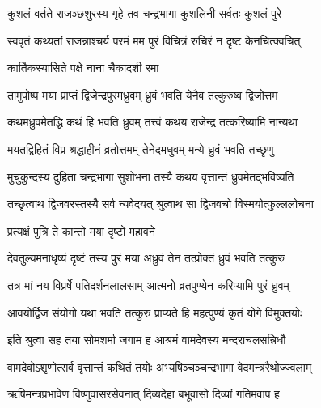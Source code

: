 
\twolineshloka
{कुशलं वर्तते राजञ्छशुरस्य गृहे तव}
{चन्द्रभागा कुशलिनी सर्वतः कुशलं पुरे} %

\twolineshloka
{स्ववृतं कथ्यतां राजन्नाश्चर्य परमं मम}
{पुरं विचित्रं रुचिरं न दृष्ट केनचित्क्वचित्} %



\onelineshloka
{कार्तिकस्यासिते पक्षे नाना चैकादशी रमा} %

\twolineshloka
{तामुपोष्प मया प्राप्तं द्विजेन्द्रपुरमध्रुवम्}
{ध्रुवं भवति येनैव तत्कुरुष्व द्विजोत्तम} %


\twolineshloka
{कथमध्रुवमेतद्धि कथं हि भवति ध्रुवम्}
{तत्त्वं कथय राजेन्द्र तत्करिष्यामि नान्यथा} %


\twolineshloka
{मयतद्विहितं विप्र श्रद्धाहीनं व्रतोत्तमम्}
{तेनेदमधुवम् मन्ये ध्रुवं भवति तच्छृणु} %

\twolineshloka
{मुचुकुन्दस्य दुहिता चन्द्रभागा सुशोभना}
{तस्यै कथय वृत्तान्तं ध्रुवमेतद्भविष्यति} %

\twolineshloka
{तच्छृत्वाथ द्विजवरस्तस्यै सर्व न्यवेदयत्}
{श्रुत्वाथ सा द्विजवचो विस्मयोत्फुल्ललोचना} %



\onelineshloka
{प्रत्यक्षं पुत्रि ते कान्तो मया दृष्टो महावने} %

\twolineshloka
{देवतुल्यमनाधृष्यं दृष्टं तस्य पुरं मया}
{अध्रुवं तेन तत्प्रोक्तं ध्रुवं भवति तत्कुरु} %


\twolineshloka
{तत्र मां नय विप्रर्षे पतिदर्शनलालसाम्}
{आत्मनो व्रतपुण्येन करिप्यामि पुरं ध्रुवम्} %

\twolineshloka
{आवयोर्द्विज संयोगो यथा भवति तत्कुरु}
{प्राप्यते हि महत्पुण्यं कृतं योगे विमुक्तयोः} %

\twolineshloka
{इति श्रुत्वा सह तया सोमशर्मा जगाम ह}
{आश्रमं वामदेवस्य मन्दराचलसन्निधौ} %

\twolineshloka
{वामदेवोऽशृणोत्सर्व वृत्तान्तं कथितं तयोः}
{अभ्यषिञ्चञ्चन्द्रभागा वेदमन्त्ररैथोज्ज्वलाम्} %

\twolineshloka
{ऋषिमन्त्रप्रभावेण विष्णुवासरसेवनात्}
{दिव्यदेहा बभूवासो दिव्यां गतिमवाप ह} %

